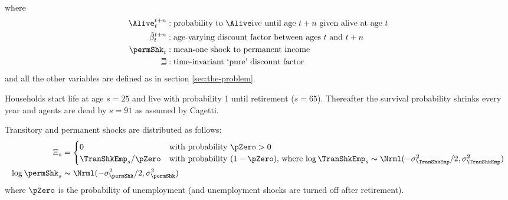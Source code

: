 \documentclass[titlepage, headings=optiontotocandhead]{Resources/texmf-local/tex/latex/econtex}
\begin{document}
where
  \begin{equation*}\begin{gathered}\begin{aligned}
        \Alive _{t}^{t+n} &:\text{probability to }\Alive\text{ive until age $t+n$ given alive at age $t$}
        \\      \hat{\beta}_{t}^{t+n} &:\text{age-varying discount factor between ages $t$ and $t+n$}
        \\     \permShk_{t} &:\text{mean-one shock to permanent income}
        \\     \beth &:\text{time-invariant `pure' discount factor}
      \end{aligned}\end{gathered}\end{equation*}
and all the other variables are defined as in section \ref{sec:the-problem}.

Households start life at age $s=25$ and live with probability 1 until retirement
($s=65$). Thereafter the survival probability shrinks every year and
agents are dead by $s=91$ as assumed by Cagetti. %

  Transitory and permanent shocks are distributed as follows:
  \begin{equation}\begin{gathered}\begin{aligned}
        \Xi_{s} & =
        \begin{cases}
          0\phantom{/\pZero} & \text{with probability $\pZero>0$} \\
          \TranShkEmp_{s}/\pZero      & \text{with probability $(1-\pZero)$, where $\log \TranShkEmp_{s}\thicksim \Nrml(-\sigma_{\TranShkEmp}^{2}/2,\sigma_{\TranShkEmp}^{2})$}\\
        \end{cases}\\
        \log \permShk_{s} &\thicksim \Nrml(-\sigma_{\permShk}^{2}/2,\sigma_{\permShk}^{2})
      \end{aligned}\end{gathered}\end{equation}
  where $\pZero$ is the probability of unemployment (and unemployment shocks are turned off after retirement).
\end{document}

